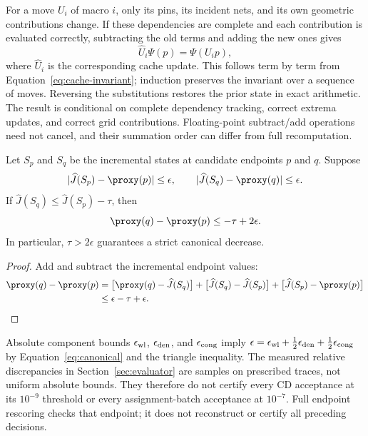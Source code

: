For a move $U_i$ of macro $i$, only its pins, its incident nets, and its own
geometric contributions change. If these dependencies are complete and each
contribution is evaluated correctly, subtracting the old terms and adding the
new ones gives
\begin{equation}
 \widehat U_i\Psi(p)=\Psi(U_i p),
 \label{eq:cache-commutation}
\end{equation}
where $\widehat U_i$ is the corresponding cache update. This follows term by
term from Equation~\eqref{eq:cache-invariant}; induction preserves the invariant
over a sequence of moves. Reversing the substitutions restores the prior state
in exact arithmetic. The result is conditional on complete dependency tracking,
correct extrema updates, and correct grid contributions. Floating-point
subtract/add operations need not cancel, and their summation order can differ
from full recomputation.

\begin{proposition}\label{prop:acceptance}
Let $S_p$ and $S_q$ be the incremental states at candidate endpoints $p$ and $q$.
Suppose
\begin{equation}
 |\widehat J(S_p)-\proxy(p)|\le\epsilon,\qquad
 |\widehat J(S_q)-\proxy(q)|\le\epsilon.
\end{equation}
If $\widehat J(S_q)\le\widehat J(S_p)-\tau$, then
\begin{equation}
 \proxy(q)-\proxy(p)\le-\tau+2\epsilon.
 \label{eq:acceptance-error}
\end{equation}
In particular, $\tau>2\epsilon$ guarantees a strict canonical decrease.
\end{proposition}
\begin{proof}
Add and subtract the incremental endpoint values:
\begin{align*}
 \proxy(q)-\proxy(p)
 &=\bigl[\proxy(q)-\widehat J(S_q)\bigr]
   +\bigl[\widehat J(S_q)-\widehat J(S_p)\bigr]
   +\bigl[\widehat J(S_p)-\proxy(p)\bigr]\\
 &\le\epsilon-\tau+\epsilon. \qedhere
\end{align*}
\end{proof}

Absolute component bounds $\epsilon_{\rm wl}$, $\epsilon_{\rm den}$, and
$\epsilon_{\rm cong}$ imply
$\epsilon=\epsilon_{\rm wl}+\tfrac12\epsilon_{\rm den}
+\tfrac12\epsilon_{\rm cong}$ by Equation~\eqref{eq:canonical} and the triangle
inequality. The measured relative discrepancies in Section~\ref{sec:evaluator}
are samples on prescribed traces, not uniform absolute bounds. They therefore
do not certify every CD acceptance at its $10^{-9}$ threshold or every
assignment-batch acceptance at $10^{-7}$. Full endpoint rescoring checks that
endpoint; it does not reconstruct or certify all preceding decisions.

